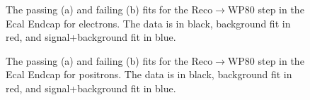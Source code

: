 \begin{thebibliography}{10}
\begin{figure}[htb]
  \begin{center}
    \caption{The passing (a) and failing (b) fits for the Reco$\to$WP80 step in the Ecal Endcap for electrons.
             The data is in black, background fit in red, and signal+background fit in blue.}
  \end{center}
\end{figure}

\begin{figure}[htb]
  \begin{center}
    \caption{The passing (a) and failing (b) fits for the Reco$\to$WP80 step in the Ecal Endcap for positrons.
             The data is in black, background fit in red, and signal+background fit in blue.}
  \end{center}
\end{figure}


\end{thebibliography}
